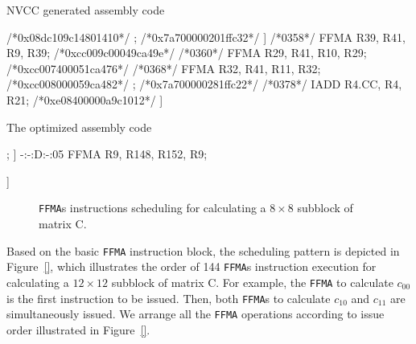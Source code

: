 \documentclass{sig-alternate-05-2015}
\begin{document}
\begin{algorithm}
      \caption{NVCC generated assembly code}\label{nvcc}
  \begin{algorithmic}[1]
      \footnotesize
        \State /*0x08dc109c14801410*/
        \State [
        \State /*0348*/ FFMA R28, R41, R15, R28; /*0xcc007000079ca472*/
        \State /*0350*/ LDS.128 R12, [0x40];     /*0x7a700000201ffc32*/
        \State ]
        \State /*0358*/ FFMA R39, R41, R9, R39; /*0xcc009c00049ca49e*/
        \State /*0360*/ FFMA R29, R41, R10, R29; /*0xcc007400051ca476*/
        \State /*0368*/ FFMA R32, R41, R11, R32; /*0xcc008000059ca482*/
        \State [
        \State /*0370*/ LDS.128 R8, [0x50]; /*0x7a700000281ffc22*/
        \State /*0378*/ IADD R4.CC, R4, R21; /*0xe08400000a9c1012*/
    \State ]
  \end{algorithmic}
\end{algorithm}



\begin{algorithm}
      \caption{The optimized assembly code }\label{nvcc}
  \begin{algorithmic}[1]
      \footnotesize
        \State [
        \State -:-:D:-:04      FFMA R3, R148, R146, R3;
        \State -:-:-:-:00      LDS.64 R168, [R222+0x400];
        \State ]
        \State -:-:D:-:05      FFMA R9, R148, R152, R9;

        \State ]
  \end{algorithmic}
\end{algorithm}

\begin{figure}[htbp]
\begin{center}
\caption{{\tt FFMA}s instructions scheduling for calculating a $8\times 8$ subblock of matrix C.}
\label{fig:order}
\end{center}
\end{figure}

Based on the basic {\tt FFMA} instruction block, the scheduling pattern is depicted in Figure~\ref{}, which illustrates the order of 144 {\tt FFMA}s instruction execution for calculating a $12\times 12$ subblock of matrix C. For example, the {\tt FFMA} to calculate $c_{00}$ is the first instruction to be issued. Then, both {\tt FFMA}s to calculate $c_{10}$ and  $c_{11}$ are simultaneously issued. We arrange all the {\tt FFMA} operations according to issue order illustrated in Figure~\ref{}.
\end{document}
